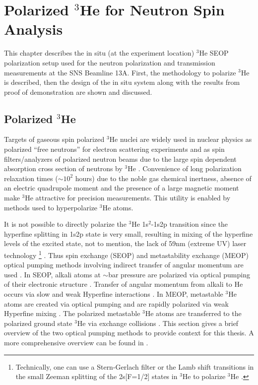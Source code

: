 \chapter{Polarized $^{3}$He for Neutron Spin Analysis}
\label{ch:polHe}

\ifpdf
    \graphicspath{{Chapter2/Figs/Raster/}{Chapter2/Figs/PDF/}{Chapter2/Figs/}}
\else
    \graphicspath{{Chapter2/Figs/Vector/}{Chapter2/Figs/}}
\fi

This chapter describes the in situ (at the experiment location) $^3$He SEOP polarization setup used for the neutron polarization and transmission measurements at the SNS Beamline 13A. First, the methodology to polarize $^{3}$He is described, then the design of the in situ system along with the results from proof of demonstration are shown and discussed.

\section{Polarized $^{3}$He}

Targets of gaseous spin polarized $^3$He nuclei are widely used in nuclear physics as polarized “free neutrons” for electron scattering experiments and as spin filters/analyzers of polarized neutron beams due to the large spin dependent absorption cross section of neutrons by $^3$He \cite{Gentile2017}. Convenience of long polarization relaxation times ($\sim 10^2$ hours) due to the noble gas chemical inertness, absence of an electric quadrupole moment and the presence of a large magnetic moment make $^3$He attractive for precision measurements. This utility is enabled by methods used to hyperpolarize $^3$He atoms. 

It is not possible to directly polarize the $^3$He 1s$^2$-1s2p transition since the hyperfine splitting in 1s2p state is very small, resulting in mixing of the hyperfine levels of the excited state, not to mention, the lack of 59nm (extreme UV) laser technology \footnote{Technically, one can use a Stern-Gerlach filter or the Lamb shift transitions in the small Zeeman splitting of the 2s[F=1/2] states in $^3$He to polarize $^3$He \cite{Schieck2011}.} \cite{Schieck2011}. Thus spin exchange (SEOP) and metastability exchange (MEOP) optical pumping methods involving indirect transfer of angular momentum are used \cite{Gentile2017}. In SEOP, alkali atoms at $\sim$bar pressure are polarized via optical pumping of their electronic structure \cite{Walker1997}. Transfer of angular momentum from alkali to He occurs via slow and weak Hyperfine interactions \cite{Walker1997}. In MEOP, metastable $^3$He atoms are created via optical pumping and are rapidly polarized via weak Hyperfine mixing \cite{Batz2011}. The polarized metastable $^3$He atoms are transferred to the polarized ground state $^3$He via exchange collisions \cite{Batz2011}. This section gives a brief overview of the two optical pumping methods to provide context for this thesis. A more comprehensive overview can be found in \cite{Gentile2017}.


